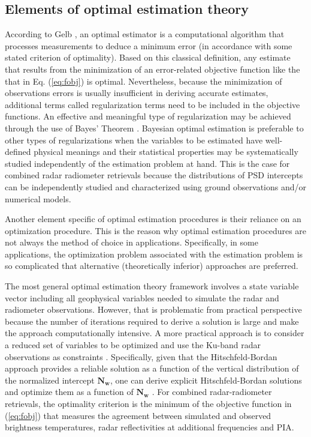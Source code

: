 \documentclass[10pt]{ietbook}
\begin{document}
\subsection{Elements of optimal estimation theory}

According to Gelb \cite{gelb1974}, an optimal estimator is a computational algorithm that processes measurements to deduce a minimum error (in accordance with some
stated criterion of optimality). Based on this classical definition, any estimate that results from the minimization of an error-related objective function like the
that in Eq. (\ref{eq:fobj}) is optimal. Nevertheless, because the minimization of observations errors is usually insufficient in deriving accurate estimates, additional
terms called regularization terms \cite{doicu2010} need to be included in the objective functions.  An effective and meaningful type of regularization may 
be achieved through the use of Bayes' Theorem \cite{maahn2020}.  Bayesian optimal estimation is preferable to other types of regularizations when the variables
to be estimated have well-defined physical meanings and their statistical properties may be systematically studied independently of the estimation problem at hand.
This is the case for combined radar radiometer retrievals because the distributions of PSD intercepts can be independently studied and characterized using
ground observations and/or numerical models.

Another element specific of optimal estimation procedures is their reliance on an optimization procedure. This is the reason why optimal estimation procedures
are not always the method of choice in applications.  Specifically, in some applications, the optimization problem  associated with the estimation problem is
so complicated that alternative (theoretically inferior) approaches are preferred.   

The most general optimal estimation theory framework involves a state variable vector including all geophysical variables needed to simulate
the radar and radiometer observations.  However, that is problematic from practical perspective because the number of iterations required 
to derive a solution is large and make the approach computationally intensive. A more practical approach is to consider a reduced set of variables
to be optimized and use the Ku-band radar observations as constraints \cite{grecu2002}.  Specifically, given that the Hitschfeld-Bordan approach 
\cite{hitschfeld1954} provides a reliable solution as a function of the vertical distribution of the normalized intercept $\mathbf{N_w}$, one can
derive explicit Hitschfeld-Bordan solutions and optimize them as a function of  $\mathbf{N_w}$ \cite{grecu2002}.  For combined radar-radiometer retrievals,
the optimality criterion is the minimum of the objective function in (\ref{eq:fobj}) that measures the agreement between simulated and observed
brightness temperatures, radar reflectivities at additional frequencies and PIA.
\end{document}
